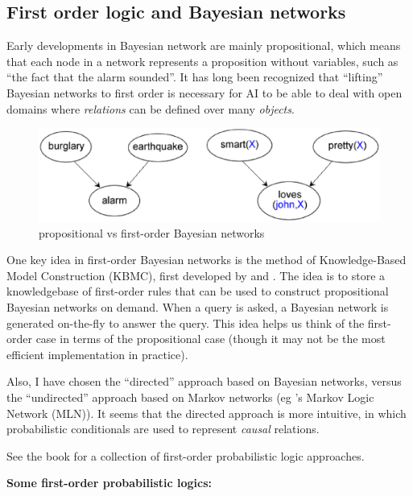 
\subsection{First order logic and Bayesian networks}
\label{sec:FOL-BN}

Early developments in Bayesian network are mainly propositional, which means that each node in a network represents a proposition without variables, such as ``the fact that the alarm sounded''.  It has long been recognized that ``lifting'' Bayesian networks to first order is necessary for AI to be able to deal with open domains where \emph{relations} can be defined over many \emph{objects}.

\begin{figure}[H]
\centering
\includegraphics[scale=0.7]{FirstOrderBayesNet.eps}
\caption{propositional vs first-order Bayesian networks}
\end{figure}

One key idea in first-order Bayesian networks is the method of Knowledge-Based Model Construction (KBMC), first developed by \citep*{Wellman1992} and \citep*{Haddawy1994}.  The idea is to store a knowledgebase of first-order rules that can be used to construct propositional Bayesian networks on demand.  When a query is asked, a Bayesian network is generated on-the-fly to answer the query.  This idea helps us think of the first-order case in terms of the propositional case (though it may not be the most efficient implementation in practice).

Also, I have chosen the ``directed'' approach based on Bayesian networks, versus the ``undirected'' approach based on Markov networks (eg \citep*{Domingos2007}'s Markov Logic Network (MLN)).  It seems that the directed approach is more intuitive, in which probabilistic conditionals are used to represent \emph{causal} relations.

See the book \citep*{Getoor2007} for a collection of first-order probabilistic logic approaches.

{\bfseries Some first-order probabilistic logics:}

